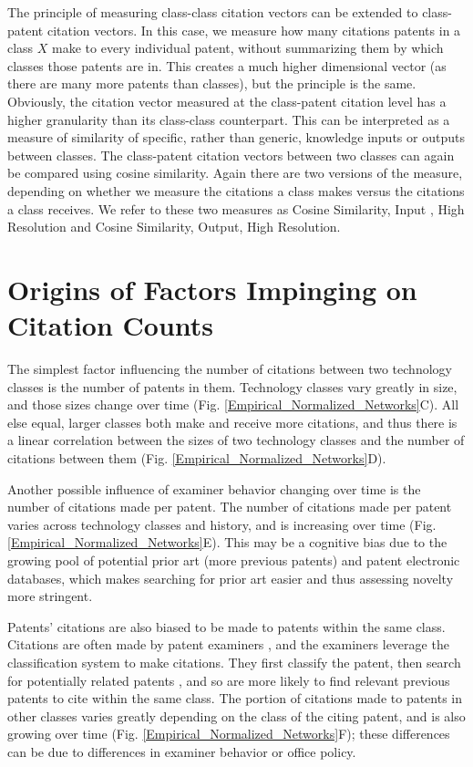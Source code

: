 \documentclass[pre,reprint,groupedaddress,superscriptaddress]{revtex4-1}
\begin{document}
The principle of measuring class-class citation vectors can be extended to class-patent citation vectors. In this case, we measure how many citations patents in a class $X$ make to every individual patent, without summarizing them by which classes those patents are in. This creates a much higher dimensional vector (as there are many more patents than classes), but the principle is the same. Obviously, the citation vector measured at the class-patent citation level has a higher granularity than its class-class counterpart. This can be interpreted as a measure of similarity of specific, rather than generic, knowledge inputs or outputs between classes. The class-patent citation vectors between two classes can again be compared using cosine similarity. Again there are two versions of the measure, depending on whether we measure the citations a class makes versus the citations a class receives. We refer to these two measures as Cosine Similarity, Input , High Resolution and Cosine Similarity, Output, High Resolution. 

\section{Origins of Factors Impinging on Citation Counts}
The simplest factor influencing the number of citations between two technology classes is the number of patents in them. Technology classes vary greatly in size, and those sizes change over time (Fig. \ref{Empirical_Normalized_Networks}C). All else equal, larger classes both make and receive more citations, and thus there is a linear correlation between the sizes of two technology classes and the number of citations between them (Fig. \ref{Empirical_Normalized_Networks}D).

Another possible influence of examiner behavior changing over time is the number of citations made per patent. The number of citations made per patent varies across technology classes and history, and is increasing over time (Fig. \ref{Empirical_Normalized_Networks}E). This may be a cognitive bias due to the growing pool of potential prior art (more previous patents) and patent electronic databases, which makes searching for prior art easier and thus assessing novelty more stringent.   

Patents' citations are also biased to be made to patents within the same class. Citations are often made by patent examiners \cite{Criscuolo2008, Alcacer2006}, and the examiners leverage the classification system to make citations. They first classify the patent, then search for potentially related patents \cite{2014}, and so are more likely to find relevant previous patents to cite within the same class. The portion of citations made to patents in other classes varies greatly depending on the class of the citing patent, and is also growing over time (Fig. \ref{Empirical_Normalized_Networks}F); these differences can be due to differences in examiner behavior or office policy. 
\end{document}
